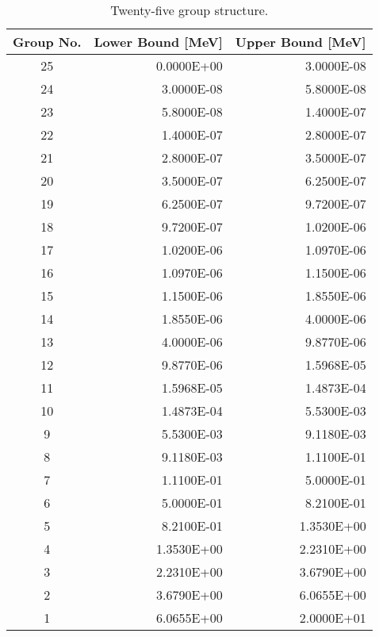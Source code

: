 \begin{appendices}
\begin{table}[h!]
  \centering
  \footnotesize
  \caption{Twenty-five group structure.}
  \label{table:app-25-groups} 
  \vspace{14pt}
  \begin{tabular}{c r r}
    \toprule
    {\bf Group No.} &
    {\bf Lower Bound [MeV]} &
    {\bf Upper Bound [MeV]} \\
    \midrule
25 & 0.0000E+00 & 3.0000E-08 \\
24 & 3.0000E-08 & 5.8000E-08 \\
23 & 5.8000E-08 & 1.4000E-07 \\
22 & 1.4000E-07 & 2.8000E-07 \\
21 & 2.8000E-07 & 3.5000E-07 \\
20 & 3.5000E-07 & 6.2500E-07 \\
19 & 6.2500E-07 & 9.7200E-07 \\
18 & 9.7200E-07 & 1.0200E-06 \\
17 & 1.0200E-06 & 1.0970E-06 \\
16 & 1.0970E-06 & 1.1500E-06 \\
15 & 1.1500E-06 & 1.8550E-06 \\
14 & 1.8550E-06 & 4.0000E-06 \\
13 & 4.0000E-06 & 9.8770E-06 \\
12 & 9.8770E-06 & 1.5968E-05 \\
11 & 1.5968E-05 & 1.4873E-04 \\
10 & 1.4873E-04 & 5.5300E-03 \\
9 & 5.5300E-03 & 9.1180E-03 \\
8 & 9.1180E-03 & 1.1100E-01 \\
7 & 1.1100E-01 & 5.0000E-01 \\
6 & 5.0000E-01 & 8.2100E-01 \\
5 & 8.2100E-01 & 1.3530E+00 \\
4 & 1.3530E+00 & 2.2310E+00 \\
3 & 2.2310E+00 & 3.6790E+00 \\
2 & 3.6790E+00 & 6.0655E+00 \\
1 & 6.0655E+00 & 2.0000E+01 \\
  \bottomrule
 \end{tabular}
\end{table}


\end{appendices}
